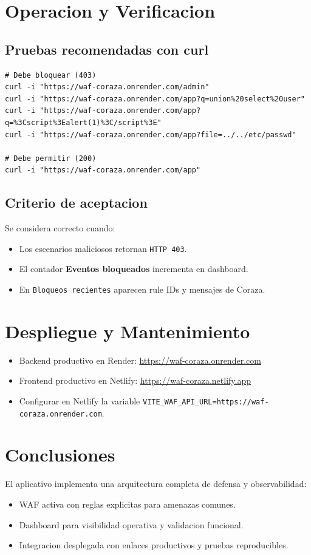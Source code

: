\documentclass[12pt,a4paper]{article}
\begin{document}
\section{Operacion y Verificacion}
\subsection{Pruebas recomendadas con curl}
\begin{lstlisting}
# Debe bloquear (403)
curl -i "https://waf-coraza.onrender.com/admin"
curl -i "https://waf-coraza.onrender.com/app?q=union%20select%20user"
curl -i "https://waf-coraza.onrender.com/app?q=%3Cscript%3Ealert(1)%3C/script%3E"
curl -i "https://waf-coraza.onrender.com/app?file=../../etc/passwd"

# Debe permitir (200)
curl -i "https://waf-coraza.onrender.com/app"
\end{lstlisting}

\subsection{Criterio de aceptacion}
Se considera correcto cuando:
\begin{itemize}
  \item Los escenarios maliciosos retornan \texttt{HTTP 403}.
  \item El contador \textbf{Eventos bloqueados} incrementa en dashboard.
  \item En \texttt{Bloqueos recientes} aparecen rule IDs y mensajes de Coraza.
\end{itemize}

\section{Despliegue y Mantenimiento}
\begin{itemize}
  \item Backend productivo en Render: \href{https://waf-coraza.onrender.com}{https://waf-coraza.onrender.com}
  \item Frontend productivo en Netlify: \href{https://waf-coraza.netlify.app}{https://waf-coraza.netlify.app}
  \item Configurar en Netlify la variable \texttt{VITE\_WAF\_API\_URL=https://waf-coraza.onrender.com}.
\end{itemize}

\section{Conclusiones}
El aplicativo implementa una arquitectura completa de defensa y observabilidad:
\begin{itemize}
  \item WAF activa con reglas explicitas para amenazas comunes.
  \item Dashboard para visibilidad operativa y validacion funcional.
  \item Integracion desplegada con enlaces productivos y pruebas reproducibles.
\end{itemize}
\end{document}
